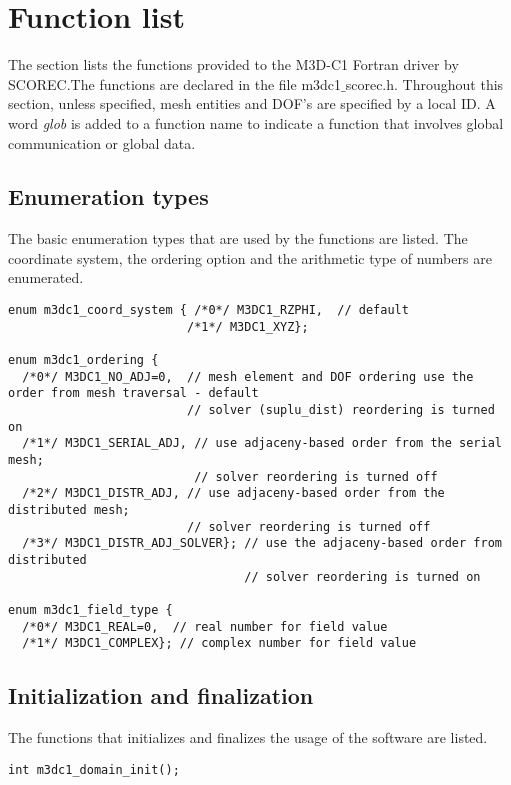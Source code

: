 \section{Function list}
The section lists the functions provided to the M3D-C1 Fortran driver by SCOREC.The functions are declared in the file m3dc1$\_$scorec.h.
Throughout this section, unless specified,  mesh entities and DOF's are specified by a local ID. A word \emph{glob} is added to a function name to indicate a function that involves global communication or global data.

\subsection{Enumeration types}
The basic enumeration types that are used by the functions are listed. The coordinate system, the ordering option and the arithmetic type of  numbers are enumerated.

\begin{verbatim}
enum m3dc1_coord_system { /*0*/ M3DC1_RZPHI,  // default
                         /*1*/ M3DC1_XYZ};

enum m3dc1_ordering { 
  /*0*/ M3DC1_NO_ADJ=0,  // mesh element and DOF ordering use the order from mesh traversal - default
                         // solver (suplu_dist) reordering is turned on
  /*1*/ M3DC1_SERIAL_ADJ, // use adjaceny-based order from the serial mesh; 
                          // solver reordering is turned off        
  /*2*/ M3DC1_DISTR_ADJ, // use adjaceny-based order from the distributed mesh;
                         // solver reordering is turned off 
  /*3*/ M3DC1_DISTR_ADJ_SOLVER}; // use the adjaceny-based order from distributed
                                 // solver reordering is turned on

enum m3dc1_field_type { 
  /*0*/ M3DC1_REAL=0,  // real number for field value
  /*1*/ M3DC1_COMPLEX}; // complex number for field value
\end{verbatim}\vspace{-.5cm}\hspace{1cm}

\subsection{Initialization and finalization}
The functions that initializes and finalizes the usage of  the software are listed.
\begin{verbatim}
int m3dc1_domain_init();
\end{verbatim}\vspace{-.5cm}\hspace{1cm}

